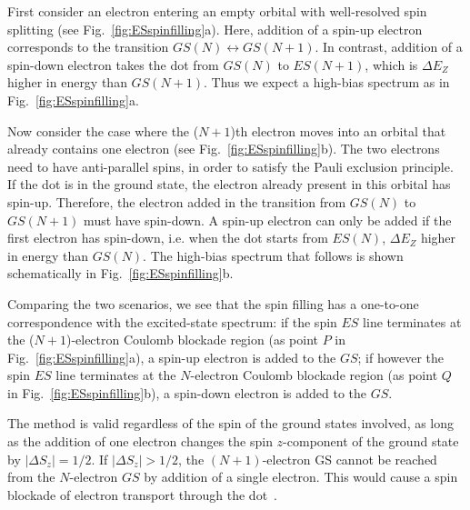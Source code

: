 \documentclass[rmp,twocolumn,aps]{revtex4}
\begin{document}
First consider an electron entering an empty orbital with
well-resolved spin splitting (see Fig.~\ref{fig:ESspinfilling}a).
Here, addition of a spin-up electron corresponds to the transition
$GS(N)\leftrightarrow GS(N\!+\!1)$. In contrast, addition of a
spin-down electron takes the dot from $GS(N)$ to $ES(N\!+\!1)$,
which is $\Delta E_{Z}$ higher in energy than $GS(N\!+\!1)$. Thus
we expect a high-bias spectrum as in
Fig.~\ref{fig:ESspinfilling}a.

Now consider the case where the ($N\!+\!1$)th electron moves into
an orbital that already contains one electron (see
Fig.~\ref{fig:ESspinfilling}b). The two electrons need to have
anti-parallel spins, in order to satisfy the Pauli exclusion
principle. If the dot is in the ground state, the electron already
present in this orbital has spin-up. Therefore, the electron added
in the transition from $GS(N)$ to $GS(N\!+\!1)$ must have
spin-down. A spin-up electron can only be added if the first
electron has spin-down, i.e. when the dot starts from $ES(N)$,
$\Delta E_{Z}$ higher in energy than $GS(N)$. The high-bias
spectrum that follows is shown schematically in
Fig.~\ref{fig:ESspinfilling}b.

Comparing the two scenarios, we see that the spin filling has a
one-to-one correspondence with the excited-state spectrum: if the
spin $ES$ line terminates at the ($N\!+\!1$)-electron Coulomb
blockade region (as point $P$ in Fig.~\ref{fig:ESspinfilling}a), a
spin-up electron is added to the $GS$; if however the spin $ES$
line terminates at the $N$-electron Coulomb blockade region (as
point $Q$ in Fig.~\ref{fig:ESspinfilling}b), a spin-down electron
is added to the $GS$.

The method is valid regardless of the spin of the ground states
involved, as long as the addition of one electron changes the spin
$z$-component of the ground state by $\left|\Delta
S_z\right|=1/2$. If $|\Delta S_z|>1/2$, the $(N+1)$-electron GS
cannot be reached from the $N$-electron $GS$ by addition of a
single electron. This would cause a spin blockade of electron
transport through the dot~\cite{Weinmann}.
\end{document}
